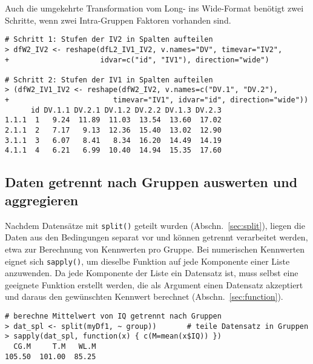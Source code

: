 Auch die umgekehrte Transformation vom Long- ins Wide-Format benötigt zwei Schritte, wenn zwei Intra-Gruppen Faktoren vorhanden sind.
\begin{lstlisting}
# Schritt 1: Stufen der IV2 in Spalten aufteilen
> dfW2_IV2 <- reshape(dfL2_IV1_IV2, v.names="DV", timevar="IV2",
+                     idvar=c("id", "IV1"), direction="wide")

# Schritt 2: Stufen der IV1 in Spalten aufteilen
> (dfW2_IV1_IV2 <- reshape(dfW2_IV2, v.names=c("DV.1", "DV.2"),
+                        timevar="IV1", idvar="id", direction="wide"))
      id DV.1.1 DV.2.1 DV.1.2 DV.2.2 DV.1.3 DV.2.3
1.1.1  1   9.24  11.89  11.03  13.54  13.60  17.02
2.1.1  2   7.17   9.13  12.36  15.40  13.02  12.90
3.1.1  3   6.07   8.41   8.34  16.20  14.49  14.19
4.1.1  4   6.21   6.99  10.40  14.94  15.35  17.60
\end{lstlisting}

\subsection{Daten getrennt nach Gruppen auswerten und aggregieren}
\label{sec:aggregate}

Nachdem Datensätze mit \lstinline!split()! geteilt wurden (Abschn.\ \ref{sec:split}), liegen die Daten aus den Bedingungen separat vor und können getrennt verarbeitet werden, etwa zur Berechnung von Kennwerten pro Gruppe. Bei numerischen Kennwerten eignet sich \lstinline!sapply()!, um dieselbe Funktion auf jede Komponente einer Liste anzuwenden. Da jede Komponente der Liste ein Datensatz ist, muss selbst eine geeignete Funktion erstellt werden, die als Argument einen Datensatz akzeptiert und daraus den gewünschten Kennwert berechnet (Abschn.\ \ref{sec:function}).
\begin{lstlisting}
# berechne Mittelwert von IQ getrennt nach Gruppen
> dat_spl <- split(myDf1, ~ group))       # teile Datensatz in Gruppen
> sapply(dat_spl, function(x) { c(M=mean(x$IQ)) })
  CG.M     T.M   WL.M
105.50  101.00  85.25
\end{lstlisting}

